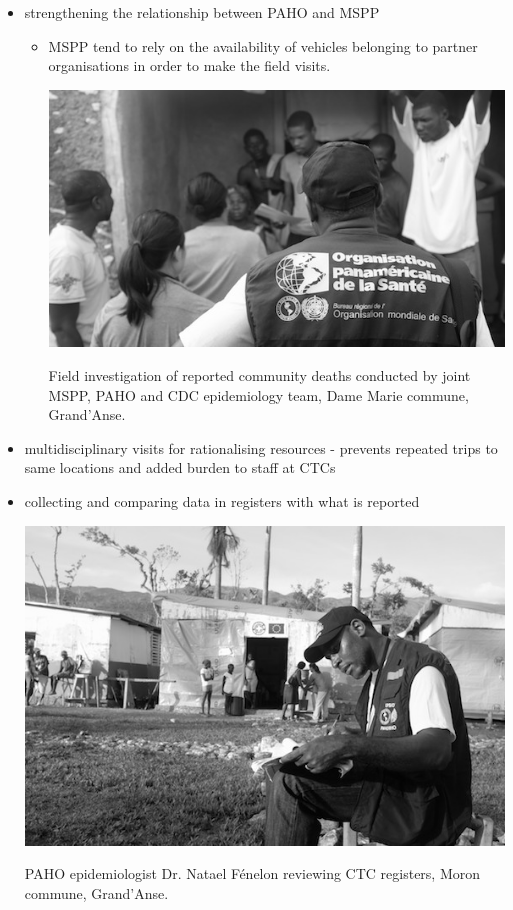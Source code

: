 \documentclass[]{tufte-handout}
\providecommand{\tightlist}{%
  \setlength{\itemsep}{0pt}\setlength{\parskip}{0pt}}
\begin{document}
\begin{itemize}
\tightlist
\item
  strengthening the relationship between PAHO and MSPP

  \begin{itemize}
  \tightlist
  \item
    MSPP tend to rely on the availability of vehicles belonging to
    partner organisations in order to make the field visits.

    \begin{marginfigure}
    \includegraphics{figure/img1.jpg}
    \caption{Field investigation of reported community deaths conducted by joint MSPP, PAHO and CDC epidemiology team, Dame Marie commune, Grand'Anse.}
    \end{marginfigure}
  \end{itemize}
\item
  multidisciplinary visits for rationalising resources - prevents
  repeated trips to same locations and added burden to staff at CTCs
\item
  collecting and comparing data in registers with what is reported

  \begin{marginfigure}
  \includegraphics{figure/img2.jpg}
  \caption{PAHO epidemiologist Dr. Natael Fénelon reviewing CTC registers, Moron commune, Grand'Anse.}
  \end{marginfigure}
\end{itemize}
\end{document}

